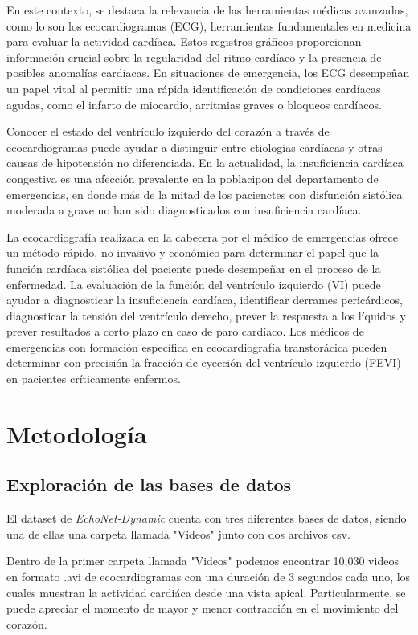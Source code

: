 \documentclass[runningheads]{llncs}
\begin{document}
En este contexto, se destaca la relevancia de las herramientas médicas avanzadas, como lo son los ecocardiogramas (ECG), herramientas fundamentales en medicina para evaluar la actividad  cardíaca. Estos registros gráficos proporcionan información crucial sobre la regularidad del ritmo cardíaco y la presencia de posibles anomalías cardíacas. En situaciones de emergencia, los ECG desempeñan un papel vital al permitir una rápida identificación de condiciones cardíacas agudas, como el infarto de miocardio, arritmias graves o bloqueos cardíacos.

Conocer el estado del ventrículo izquierdo del corazón a través de ecocardiogramas puede ayudar a distinguir entre etiologías cardíacas y otras causas de hipotensión no diferenciada. En la actualidad, la insuficiencia cardíaca congestiva es una afección prevalente en la poblacipon del departamento de emergencias, en donde más de la mitad de los pacienctes con disfunción sistólica moderada a grave no han sido diagnosticados con insuficiencia cardíaca. 

La ecocardiografía realizada en la cabecera por el médico de emergencias ofrece un método rápido, no invasivo y económico para determinar el papel que la función cardíaca sistólica del paciente puede desempeñar en el proceso de la enfermedad. La evaluación de la función del ventrículo izquierdo (VI) puede ayudar a diagnosticar la insuficiencia cardíaca, identificar derrames pericárdicos, diagnosticar la tensión del ventrículo derecho, prever la respuesta a los líquidos y prever resultados a corto plazo en caso de paro cardíaco. Los médicos de emergencias con formación específica en ecocardiografía transtorácica pueden determinar con precisión la fracción de eyección del ventrículo izquierdo (FEVI) en pacientes críticamente enfermos. \citep{now2015bedside}

\section{Metodología}

\subsection{Exploración de las bases de datos}

El dataset de \textit{EchoNet-Dynamic} cuenta con tres diferentes bases de datos, siendo una de ellas una carpeta llamada "Videos" junto con dos archivos csv.

Dentro de la primer carpeta llamada "Videos" podemos encontrar 10,030 videos en formato .avi de ecocardiogramas con una duración de 3 segundos cada uno, los cuales muestran la actividad cardiáca desde una vista apical. Particularmente, se puede apreciar el momento de mayor y menor contracción en el movimiento del corazón.
\end{document}
